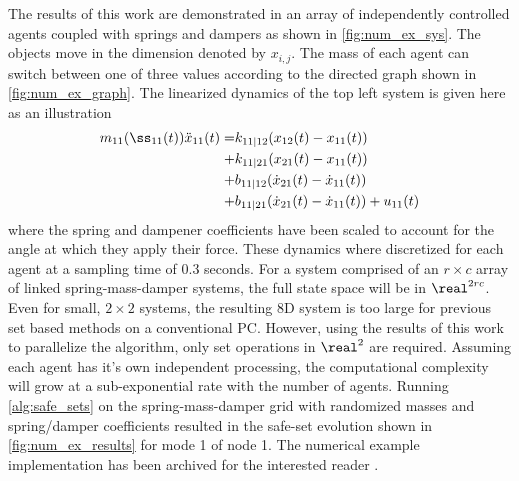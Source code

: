 The results of this work are demonstrated in an array of independently controlled agents coupled with springs and dampers as shown in \autoref{fig:num_ex_sys}. The objects move in the dimension denoted by $x_{i,j}$. The mass of each agent can switch between one of three values according to the directed graph shown in \autoref{fig:num_ex_graph}. The linearized dynamics of the top left system is given here as an illustration 
\begin{align*}
m_{11}(\ss_{11}(t))\ddot{x}_{11}(t) = &k_{11|12}(x_{12}(t)-x_{11}(t))\\
+&k_{11|21}(x_{21}(t)-x_{11}(t))\\
+&b_{11|12}(\dot x_{21}(t)-\dot x_{11}(t))\\
+&b_{11|21}(\dot x_{21}(t)-\dot x_{11}(t)) + u_{11}(t)
\end{align*}
 where the spring and dampener coefficients have been scaled to account for the angle at which they apply their force. These dynamics where discretized for each agent at a sampling time of $0.3$ seconds. For a system comprised of an $r\times c$ array of linked spring-mass-damper systems, the full state space will be in $\real^{2rc}$. Even for small, $2\times 2$ systems, the resulting 8D system is too large for previous set based methods on a conventional PC. However, using the results of this work to parallelize the algorithm, only set operations in $\real^2$ are required. Assuming each agent has it's own independent processing, the computational complexity will grow at a sub-exponential rate with the number of agents. Running \autoref{alg:safe_sets} on the spring-mass-damper grid with randomized masses and spring/damper coefficients resulted in the safe-set evolution shown in \autoref{fig:num_ex_results} for mode 1 of node 1. The numerical example implementation has been archived for the interested reader \cite{PaperSoftware}. 